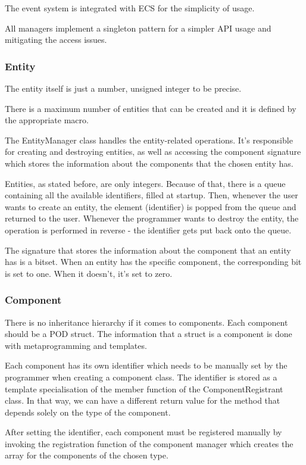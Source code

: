 \documentclass[12pt, english]{article}
\begin{document}
The event system is integrated with ECS for the simplicity of usage.

All managers implement a singleton pattern for a simpler API usage and
mitigating the access issues.

\subsubsection{Entity}
The entity itself is just a number, unsigned integer to be precise.

There is a maximum number of entities that can be created and it is defined by
the appropriate macro.

The EntityManager class handles the entity-related operations. It's responsible
for creating and destroying entities, as well as accessing the component
signature which stores the information about the components that the chosen
entity has.

Entities, as stated before, are only integers. Because of that, there is a
queue containing all the available identifiers, filled at startup. Then,
whenever the user wants to create an entity, the element (identifier) is popped
from the queue and returned to the user. Whenever the programmer wants to
destroy the entity, the operation is performed in reverse - the identifier gets
put back onto the queue.

The signature that stores the information about the component that an entity
has is a bitset. When an entity has the specific component, the corresponding
bit is set to one. When it doesn't, it's set to zero.


\subsubsection{Component}

There is no inheritance hierarchy if it comes to components. Each component
should be a POD struct. The information that a struct is a component is done
with metaprogramming and templates.

Each component has its own identifier which needs to be manually set by the
programmer when creating a component class. The identifier is stored as a
template specialisation of the member function of the ComponentRegistrant
class. In that way, we can have a different return value for the method that
depends solely on the type of the component.

After setting the identifier, each component must be registered manually by
invoking the registration function of the component manager which creates the
array for the components of the chosen type.
\end{document}
